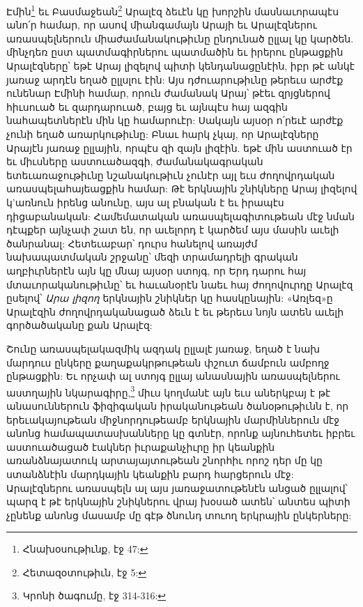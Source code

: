 \documentclass{article}
\begin{document}
{Էմին\footnote{Հնախօսութիւնք, էջ 47:} եւ Բասմաջեան\footnote{Հետազօտութիւն, էջ 5:} Արալէզ ձեւէն կը խորշին մասնաւորապէս անո՛ր համար, որ ասով միանգամայն Արայի եւ Արալէզներու առասպելներուն միաժամանակութիւնը ընդունած ըլլալ կը կարծեն. մինչդեռ ըստ պատմագիրներու պատմածին եւ իրերու ընթացքին Արալէզները՝ եթէ Արայ լիզելով պիտի կենդանացընէին, իբր թէ անկէ յառաջ արդէն եղած ըլլսլու էին: Այս դժուարութիւնը թերեւս արժէք ունենար Էմինի համար, որուն ժամանակ Արայ՝ թէեւ զրյցներով հիւսուած եւ զարդարուած, բայց եւ այնպէս հայ ազգին նահապետներէն մին կը համարուէր: Սակայն այսօր ո՛րեւէ արժէք չունի եղած առարկութիւնը: Բնաւ հարկ չկայ, որ Արալէզները Արայէն յառաջ ըլլային, որպէս զի զայն լիզէին. եթէ մին աստուած էր եւ միւսները աստուածազգի, ժամանակագրական ետեւառաջութիւնը նշանակութիւն չունէր այլ եւս ժողովրդական առասպելահայեացքին համար: Թէ երկնային շնիկները Արայ լիզելով կ'առնուն իրենց անունը, այս ալ բնական է եւ իրապէս դիցաբանական: Համեմատական առասպելագիտութեան մէջ նման դէպքեր այնչափ շատ են, որ աւելորդ է կարծեմ այս մասին աւելի ծանրանալ: Հետեւաբար՝ դուրս հանելով առայժմ նախապատմական շրջանը՝ մեզի տրամադրելի գրական աղբիւրներէն այն կը մնայ այսօր ստոյգ, որ Երդ դարու հայ մտաւորականութիւնը՝ եւ հաւանօրէն նաեւ հայ ժողովուրդը Արալէզ ըսելով՝ \emph{Արա լիզող} երկնային շնիկներ կը հասկընային: «Առլեզ»ը Արալէզին ժողովրդականացած ձեւն է եւ թերեւս նոյն ատեն աւելի գործածականը քան Արալէզ:

Շունը առասպելակազմիկ ազդակ ըլլալէ յառաջ, եղած է նախ մարդուս ընկերը քաղաքակրթութեան փշուտ ճամբուն ամբողջ ընթացքին: Եւ որչափ ալ ստոյգ ըլլայ անասնային առասպելներու աստղային նկարագիրը,\footnote{Կրոնի ծագումը, էջ 314-316:} միւս կողմանէ այն եւս աներկբայ է թէ անասուններուն ֆիզիգական իրականութեան ծանօթութիւնն է, որ երեւակայութեան միջնորդութեամբ երկնային մարմիններուն մէջ անոնց համապատասխանները կը գտնէր, որոնք այնուհետեւ իբրեւ աստուածացած էակներ իւրաքանչիւրը իր կեանքին առանձնայատուկ արտայայտութեան շնորհիւ որոշ դեր մը կը ստանձնէին մարդկային կեանքին բարդ հարցերուն մէջ: Արալէզներու առասպելն ալ այս յառաջատութենէն անցած ըլլալով՝ պարզ է թէ երկնային շնիկներու վրայ խօսած ատեն՝ անտես պիտի չընենք անոնց մասամբ մը գէթ ծնունդ տուող երկրային ընկերները:

}
\end{document}
